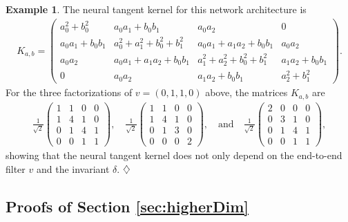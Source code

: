 \documentclass[twoside]{article}
\theoremstyle{definition}
\newtheorem{example}[theorem]{Example}
\theoremstyle{remark}
\begin{document}
\begin{example}
The neural tangent kernel for this network architecture is
\begin{align*} %
    K_{a,b} = \left(
\begin{array}{cccc}
   a_0^2+b_0^2  & a_0 a_1 +  b_0 b_1 & a_0a_2 & 0 \\
   a_0 a_1 +  b_0 b_1  & a_0^2+a_1^2+b_0^2+b_1^2 & a_0a_1 + a_1a_2 + b_0b_1 & a_0a_2
   \\ 
   a_0a_2 & a_0a_1 + a_1a_2 + b_0b_1 & a_1^2+a_2^2+b_0^2+b_1^2 & a_1 a_2 + b_0b_1
   \\ 0 & a_0a_2 & a_1 a_2 + b_0b_1 & a_2^2+b_1^2
\end{array}
    \right).
\end{align*}
For the three factorizations of $v = (0,1,1,0)$ above, the matrices $K_{a,b}$ are
\begin{align*}%
  \frac{1}{\sqrt{2}}  \left( \begin{array}{cccc}
        1 & 1 & 0 & 0 \\
        1 & 4 & 1 & 0 \\
        0 & 1 & 4 & 1 \\
        0 & 0 & 1 & 1
    \end{array} \right), \quad 
    \frac{1}{\sqrt{2}}  \left( \begin{array}{cccc}
        1 & 1 & 0 & 0 \\
        1 & 4 & 1 & 0 \\
        0 & 1 & 3 & 0 \\
        0 & 0 & 0 & 2
    \end{array} \right), \quad \text{and} \quad 
    \frac{1}{\sqrt{2}}  \left( \begin{array}{cccc}
        2&0&0&0 \\
        0&3&1&0 \\
        0&1&4&1 \\
        0&0&1&1
    \end{array} \right),
\end{align*}
showing that the neural tangent kernel does not only depend on the end-to-end filter $v$ and the invariant $\delta$.
 $\hfill \diamondsuit$
\end{example}


\subsection{Proofs of Section \ref{sec:higherDim}}
\end{document}
